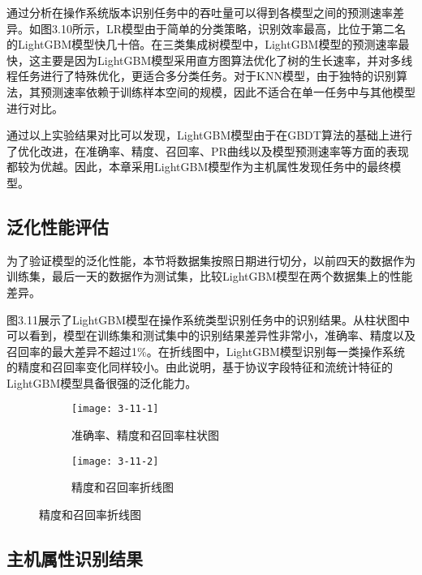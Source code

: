 通过分析在操作系统版本识别任务中的吞吐量可以得到各模型之间的预测速率差异。如图3.10所示，LR模型由于简单的分类策略，识别效率最高，比位于第二名的LightGBM模型快几十倍。在三类集成树模型中，LightGBM模型的预测速率最快，这主要是因为LightGBM模型采用直方图算法优化了树的生长速率，并对多线程任务进行了特殊优化，更适合多分类任务。对于KNN模型，由于独特的识别算法，其预测速率依赖于训练样本空间的规模，因此不适合在单一任务中与其他模型进行对比。

通过以上实验结果对比可以发现，LightGBM模型由于在GBDT算法的基础上进行了优化改进，在准确率、精度、召回率、PR曲线以及模型预测速率等方面的表现都较为优越。因此，本章采用LightGBM模型作为主机属性发现任务中的最终模型。

\subsection{泛化性能评估}

为了验证模型的泛化性能，本节将数据集按照日期进行切分，以前四天的数据作为训练集，最后一天的数据作为测试集，比较LightGBM模型在两个数据集上的性能差异。

图3.11展示了LightGBM模型在操作系统类型识别任务中的识别结果。从柱状图中可以看到，模型在训练集和测试集中的识别结果差异性非常小，准确率、精度以及召回率的最大差异不超过1\%。在折线图中，LightGBM模型识别每一类操作系统的精度和召回率变化同样较小。由此说明，基于协议字段特征和流统计特征的LightGBM模型具备很强的泛化能力。

\begin{figure}[!htbp]
    \centering
    \begin{subfigure}[b]{0.33\textwidth}
      \texttt{[image: 3-11-1]}
      \caption{准确率、精度和召回率柱状图}
    \end{subfigure}%
    \hspace{20pt}
    \begin{subfigure}[b]{0.4\textwidth}
      \texttt{[image: 3-11-2]}
      \caption{精度和召回率折线图}
    \end{subfigure}
    \label{fig:3-11}
\end{figure}

\subsection{主机属性识别结果}


